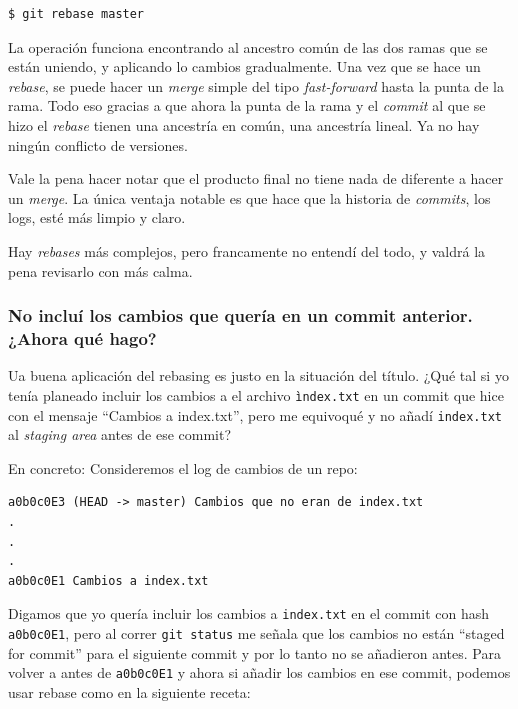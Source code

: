 \begin{lstlisting}
$ git rebase master
\end{lstlisting}

La operación funciona encontrando al ancestro común de las dos ramas que
se están uniendo, y aplicando lo cambios gradualmente. Una vez que se
hace un \emph{rebase}, se puede hacer un \emph{merge} simple del tipo
\emph{fast-forward} hasta la punta de la rama. Todo eso gracias a que
ahora la punta de la rama y el \emph{commit} al que se hizo el
\emph{rebase} tienen una ancestría en común, una ancestría lineal. Ya no
hay ningún conflicto de versiones.

Vale la pena hacer notar que el producto final no tiene nada de
diferente a hacer un \emph{merge}. La única ventaja notable es que hace
que la historia de \emph{commits}, los logs, esté más limpio y claro.

Hay \emph{rebases} más complejos, pero francamente no entendí del todo,
y valdrá la pena revisarlo con más calma.

\subsubsection{No incluí los cambios que quería en un commit anterior.
¿Ahora qué hago?}

Ua buena aplicación del rebasing es justo en la situación del título.
¿Qué tal si yo tenía planeado incluir los cambios a el archivo
\passthrough{\lstinline!ìndex.txt!} en un commit que hice con el mensaje
``Cambios a index.txt'', pero me equivoqué y no añadí
\passthrough{\lstinline!index.txt!} al \emph{staging area} antes de ese
commit?

En concreto: Consideremos el log de cambios de un repo:

\begin{lstlisting}
a0b0c0E3 (HEAD -> master) Cambios que no eran de index.txt
.
.
.
a0b0c0E1 Cambios a index.txt
\end{lstlisting}

Digamos que yo quería incluir los cambios a
\passthrough{\lstinline!index.txt!} en el commit con hash
\passthrough{\lstinline!a0b0c0E1!}, pero al correr
\passthrough{\lstinline!git status!} me señala que los cambios no están
``staged for commit'' para el siguiente commit y por lo tanto no se
añadieron antes. Para volver a antes de
\passthrough{\lstinline!a0b0c0E1!} y ahora si añadir los cambios en ese
commit, podemos usar rebase como en la siguiente receta:

